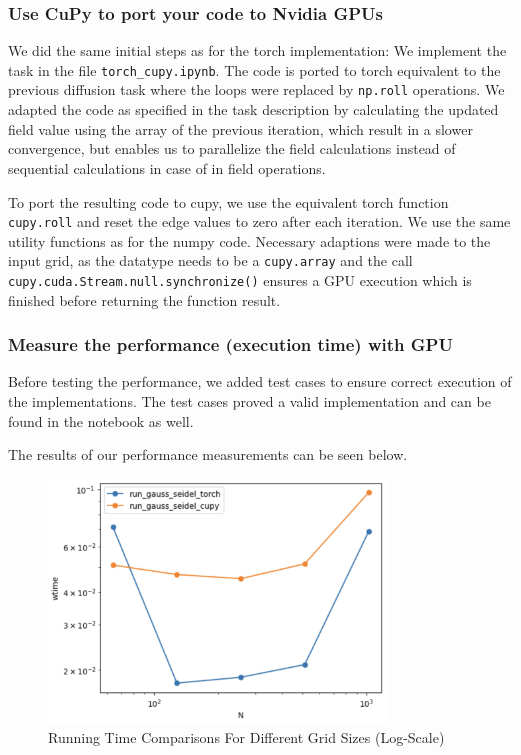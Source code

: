 \documentclass[a4paper,12pt]{article}
\begin{document}
\subsubsection{Use CuPy to port your code to Nvidia GPUs}
We did the same initial steps as for the torch implementation:
We implement the task in the file \verb|torch_cupy.ipynb|. The code is ported to torch equivalent to the previous diffusion task
where the loops were replaced by \verb|np.roll| operations. We adapted the code as specified in the task description by calculating the
updated field value using the array of the previous iteration, which result in a slower convergence, but enables us to parallelize the field calculations
instead of sequential calculations in case of in field operations.

To port the resulting code to cupy, we use the equivalent torch function \verb|cupy.roll| and reset the edge values to zero after each iteration. We use the same utility functions as for the numpy code.
Necessary adaptions were made to the input grid, as the datatype needs to be a \verb|cupy.array| and the call \verb|cupy.cuda.Stream.null.synchronize()| ensures a GPU execution which is finished before returning the function result.

\subsubsection{Measure the performance (execution time) with GPU}
Before testing the performance, we added test cases to ensure correct execution of the implementations.
The test cases proved a valid implementation and can be found in the notebook as well.

The results of our performance measurements can be seen below.
\begin{figure}[H]
  \centering
  \includegraphics[width=0.8\textwidth]{images/cupy_torch_gpu.png}
  \caption{Running Time Comparisons For Different Grid Sizes (Log-Scale)}
\end{figure}
\end{document}
